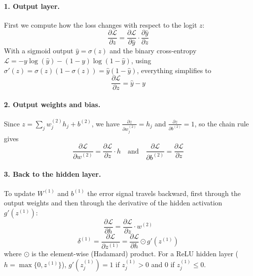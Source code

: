 \paragraph{1. Output layer.} First we compute how the loss changes with respect to
the logit $z$:
\begin{equation}
    \frac{\partial \mathcal{L}}{\partial z} = \frac{\partial \mathcal{L}}{\partial \hat{y}} \cdot \frac{\partial \hat{y}}{\partial z}
\end{equation}
With a sigmoid output $\hat{y} = \sigma(z)$ and the binary cross-entropy
$\mathcal{L} = -y \log(\hat{y}) - (1-y)\log(1-\hat{y})$, using
$\sigma'(z) = \sigma(z)(1-\sigma(z)) = \hat{y}(1-\hat{y})$, everything simplifies to
\begin{equation}
    \frac{\partial \mathcal{L}}{\partial z} = \hat{y} - y
\end{equation}

\paragraph{2. Output weights and bias.} Since
$z = \sum_j w_j^{(2)} h_j + b^{(2)}$, we have $\frac{\partial z}{\partial w_j^{(2)}} = h_j$
and $\frac{\partial z}{\partial b^{(2)}} = 1$, so the chain rule gives
\begin{equation}
    \frac{\partial \mathcal{L}}{\partial w^{(2)}} = \frac{\partial \mathcal{L}}{\partial z} \cdot h \quad \text{and} \quad \frac{\partial \mathcal{L}}{\partial b^{(2)}} = \frac{\partial \mathcal{L}}{\partial z}
\end{equation}

\paragraph{3. Back to the hidden layer.} To update $W^{(1)}$ and $b^{(1)}$ the error
signal travels backward, first through the output weights and then through the
derivative of the hidden activation $g'\left(z^{(1)}\right)$:
\begin{equation}
    \frac{\partial \mathcal{L}}{\partial h} = \frac{\partial \mathcal{L}}{\partial z} \cdot w^{(2)}
\end{equation}
\begin{equation}
    \delta^{(1)} = \frac{\partial \mathcal{L}}{\partial z^{(1)}} = \frac{\partial \mathcal{L}}{\partial h} \odot g'\left(z^{(1)}\right)
\end{equation}
where $\odot$ is the element-wise (Hadamard) product. For a ReLU hidden layer
($h = \max\{0, z^{(1)}\}$), $g'(z_j^{(1)}) = 1$ if $z_j^{(1)} > 0$ and $0$ if
$z_j^{(1)} \leq 0$.

